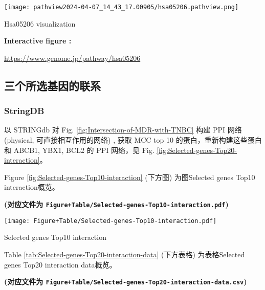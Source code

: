 \documentclass[
]{article}
\begin{document}
\def\@captype{figure}
\begin{center}
\texttt{[image: pathview2024-04-07\_14\_43\_17.00905/hsa05206.pathview.png]}
\caption{Hsa05206 visualization}\label{fig:Hsa05206-visualization}
\end{center}
\begin{center}\begin{tcolorbox}[colback=gray!10, colframe=gray!50, width=0.9\linewidth, arc=1mm, boxrule=0.5pt]
\textbf{
Interactive figure
:}

\vspace{0.5em}

    \url{https://www.genome.jp/pathway/hsa05206}

\vspace{2em}
\end{tcolorbox}
\end{center}

\hypertarget{others}{%
\subsection{三个所选基因的联系}\label{others}}

\hypertarget{stringdb}{%
\subsubsection{StringDB}\label{stringdb}}

以 STRINGdb 对 Fig. \ref{fig:Intersection-of-MDR-with-TNBC} 构建 PPI 网络 (physical, 可直接相互作用的网络) ,
获取 MCC top 10 的蛋白，重新构建这些蛋白和 ABCB1, YBX1, BCL2 的 PPI 网络，见
Fig. \ref{fig:Selected-genes-Top20-interaction}。

Figure \ref{fig:Selected-genes-Top10-interaction} (下方图) 为图Selected genes Top10 interaction概览。

\textbf{(对应文件为 \texttt{Figure+Table/Selected-genes-Top10-interaction.pdf})}

\def\@captype{figure}
\begin{center}
\texttt{[image: Figure+Table/Selected-genes-Top10-interaction.pdf]}
\caption{Selected genes Top10 interaction}\label{fig:Selected-genes-Top10-interaction}
\end{center}

Table \ref{tab:Selected-genes-Top20-interaction-data} (下方表格) 为表格Selected genes Top20 interaction data概览。

\textbf{(对应文件为 \texttt{Figure+Table/Selected-genes-Top20-interaction-data.csv})}
\end{document}
